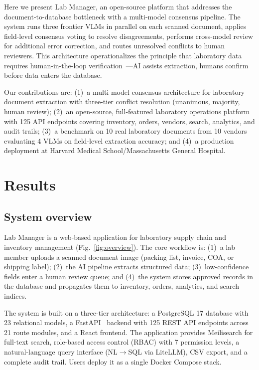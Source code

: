\documentclass[11pt]{article}
\begin{document}
Here we present Lab Manager, an open-source platform that addresses the
document-to-database bottleneck with a multi-model consensus pipeline. The
system runs three frontier VLMs in parallel on each scanned document,
applies field-level consensus voting to resolve disagreements, performs
cross-model review for additional error correction, and routes unresolved
conflicts to human reviewers. This architecture operationalizes the
principle that laboratory data requires human-in-the-loop
verification~\citep{monarch2021human, amershi2014power}---AI assists
extraction, humans confirm before data enters the database.

Our contributions are: (1)~a multi-model consensus architecture for
laboratory document extraction with three-tier conflict resolution
(unanimous, majority, human review); (2)~an open-source, full-featured
laboratory operations platform with 125 API endpoints covering inventory,
orders, vendors, search, analytics, and audit trails; (3)~a benchmark on
10 real laboratory documents from 10 vendors evaluating 4 VLMs on
field-level extraction accuracy; and (4)~a production deployment at
Harvard Medical School/Massachusetts General Hospital.

\section{Results}
\label{sec:results}

\subsection{System overview}
\label{sec:overview}

Lab Manager is a web-based application for laboratory supply chain and
inventory management (Fig.~\ref{fig:overview}). The core workflow is:
(1)~a lab member uploads a scanned document image (packing list, invoice,
COA, or shipping label); (2)~the AI pipeline extracts structured data;
(3)~low-confidence fields enter a human review queue; and (4)~the system
stores approved records in the database and propagates them to inventory,
orders, analytics, and search indices.

The system is built on a three-tier architecture: a PostgreSQL 17 database
with 23 relational models, a FastAPI~\citep{fastapi2024} backend with 125
REST API endpoints across 21 route modules, and a React frontend. The
application provides Meilisearch for full-text search, role-based access
control (RBAC) with 7 permission levels, a natural-language query interface
(NL$\to$SQL via LiteLLM), CSV export, and a complete audit trail. Users
deploy it as a single Docker Compose stack.
\end{document}

